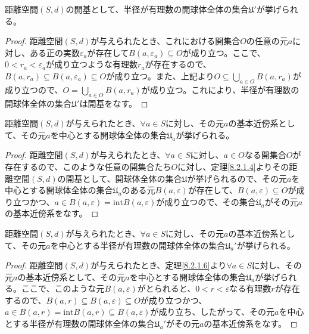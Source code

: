 \documentclass[dvipdfmx]{jsarticle}
\begin{document}
\begin{thm}\label{8.2.1.5}
距離空間$(S,d)$の開基として、半径が有理数の開球体全体の集合$\mathfrak{U}'$が挙げられる。
\end{thm}
\begin{proof}
距離空間$(S,d)$が与えられたとき、これにおける開集合$O$の任意の元$a$に対し、ある正の実数$\varepsilon_{a}$が存在して$B\left( a,\varepsilon_{a} \right) \subseteq O$が成り立つ。ここで、$0 < r_{a} < \varepsilon_{a}$が成り立つような有理数$r_{a}$が存在するので、$B\left( a,r_{a} \right) \subseteq B\left( a,\varepsilon_{a} \right) \subseteq O$が成り立つ。また、上記より$O \subseteq \bigcup_{a \in O} {B\left( a,r_{a} \right)}$が成り立つので、$O = \bigcup_{a \in O} {B\left( a,r_{a} \right)}$が成り立つ。これにより、半径が有理数の開球体全体の集合$\mathfrak{U}'$は開基をなす。
\end{proof}
\begin{thm}\label{8.2.1.6}
距離空間$(S,d)$が与えられたとき、$\forall a \in S$に対し、その元$a$の基本近傍系として、その元$a$を中心とする開球体全体の集合$\mathfrak{U}_{a}$が挙げられる。
\end{thm}
\begin{proof}
距離空間$(S,d)$が与えられたとき、$\forall a \in S$に対し、$a \in O$なる開集合$O$が存在するので、このような任意の開集合たち$O$に対し、定理\ref{8.2.1.4}よりその距離空間$(S,d)$の開基として、開球体全体の集合$\mathfrak{U}$が挙げられるので、その元$a$を中心とする開球体全体の集合$\mathfrak{U}_{a}$のある元$B(a,\varepsilon)$が存在して、$B(a,\varepsilon) \subseteq O$が成り立つかつ、$a \in B(a,\varepsilon) = {\mathrm{int}}{B(a,\varepsilon)}$が成り立つので、その集合$\mathfrak{U}_{a}$がその元$a$の基本近傍系をなす。
\end{proof}
\begin{thm}\label{8.2.1.7}
距離空間$(S,d)$が与えられたとき、$\forall a \in S$に対し、その元$a$の基本近傍系として、その元$a$を中心とする半径が有理数の開球体全体の集合$\mathfrak{U}_{a}'$が挙げられる。
\end{thm}
\begin{proof} 距離空間$(S,d)$が与えられたとき、定理\ref{8.2.1.6}より$\forall a \in S$に対し、その元$a$の基本近傍系として、その元$a$を中心とする開球体全体の集合$\mathfrak{U}_{a}$が挙げられる。ここで、このような元$B(a,\varepsilon)$がとられると、$0 < r < \varepsilon$なる有理数$r$が存在するので、$B(a,r) \subseteq B(a,\varepsilon) \subseteq O$が成り立つかつ、$a \in B(a,r) = {\mathrm{int}}{B(a,r)} \subseteq B(a,\varepsilon)$が成り立ち、したがって、その元$a$を中心とする半径が有理数の開球体全体の集合$\mathfrak{U}_{a}'$がその元$a$の基本近傍系をなす。
\end{proof}
\end{document}
